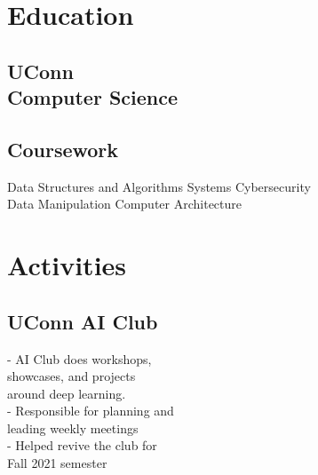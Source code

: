\documentclass[]{resume-template}
\begin{document}
%
%
\lastupdated{}

%
%

%
%

\begin{minipage}[t]{0.33\textwidth}


    \section{Education}\label{sec:education}

    \subsection{UConn\\ Computer Science}%
    \vspace{\topsep}
    \subsection{Coursework}\label{subsec:coursework}
    Data Structures and Algorithms %
    Systems \textbullet{} Cybersecurity \textbullet{} \\
    Data Manipulation \textbullet{}  Computer Architecture
    \sectionsep{}




    \section{Activities}\label{sec:activities}

    \subsection{UConn AI Club}\label{subsec:uconn-ai-club}
    - AI Club does workshops,\\showcases, and projects \\around deep learning.\\
    - Responsible for planning and\\ leading weekly meetings\\
    - Helped revive the club for \\ Fall 2021 semester
    \vspace{\topsep}



\end{minipage}
\end{document}
